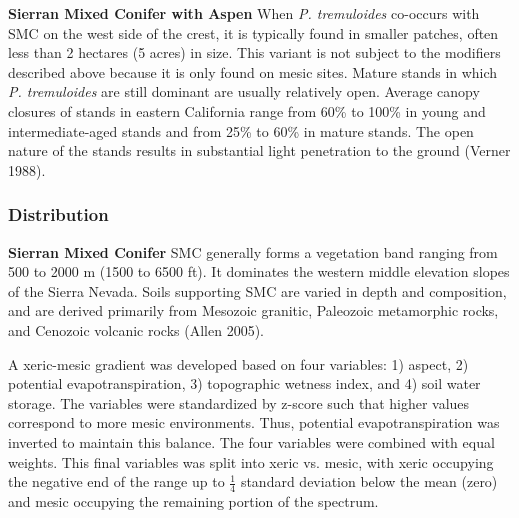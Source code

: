 \medskip
\noindent \textbf{Sierran Mixed Conifer  with Aspen} When \emph{P. tremuloides} co-occurs with SMC on the west side of the crest, it is typically found in smaller patches, often less than 2 hectares (5 acres) in size. This variant is not subject to the modifiers described above because it is only found on mesic sites. Mature stands in which \emph{P. tremuloides} are still dominant are usually relatively open. Average canopy closures of stands in eastern California range from 60\% to 100\% in young and intermediate-aged stands and from 25\% to 60\% in mature stands. The open nature of the stands results in substantial light penetration to the ground (Verner 1988).



\subsubsection{Distribution}

\textbf{Sierran Mixed Conifer } SMC generally forms a vegetation band ranging from 500 to 2000 m (1500 to 6500 ft). It dominates the western middle elevation slopes of the Sierra Nevada. Soils supporting SMC are varied in depth and composition, and are derived primarily from Mesozoic granitic, Paleozoic metamorphic rocks, and Cenozoic volcanic rocks (Allen 2005). 

A xeric-mesic gradient was developed based on four variables: 1) aspect, 2) potential evapotranspiration, 3) topographic wetness index, and 4) soil water storage. The variables were standardized by z-score such that higher values correspond to more mesic environments. Thus, potential evapotranspiration was inverted to maintain this balance. The four variables were combined with equal weights. This final variables was split into xeric vs. mesic, with xeric occupying the negative end of the range up to $\frac{1}{4}$ standard deviation below the mean (zero) and mesic occupying the remaining portion of the spectrum.


